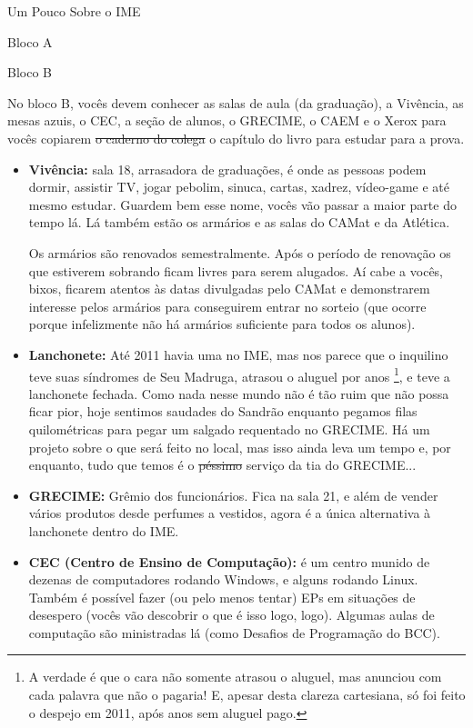 \begin{secao}{Um Pouco Sobre o IME}
\begin{subsecao}{Bloco A}
\begin{itemize}
\end{itemize}
\end{subsecao}

\begin{subsecao}{Bloco B}

No bloco B, vocês devem conhecer as salas de aula (da graduação), a Vivência, as
mesas azuis, o CEC, a seção de alunos, o GRECIME, o CAEM e o Xerox para vocês
copiarem \sout{o caderno do colega} o capítulo do livro para estudar para a prova.

\begin{itemize}
\item {\bf Vivência:} sala 18, arrasadora de graduações, é onde as pessoas podem 
dormir, assistir TV, jogar pebolim, sinuca, cartas, xadrez, vídeo-game e até 
mesmo estudar. Guardem bem esse nome, vocês vão passar a maior parte do tempo lá. 
Lá também estão os armários e as salas do CAMat e da Atlética.

Os armários são renovados semestralmente. Após o período de renovação os que 
estiverem sobrando ficam livres para serem alugados. Aí cabe a vocês, bixos, ficarem 
atentos às datas divulgadas pelo CAMat e demonstrarem interesse pelos armários para 
conseguirem entrar no sorteio (que ocorre porque infelizmente não há armários 
suficiente para todos os alunos).

\item {\bf Lanchonete:} Até 2011 havia uma no IME, mas nos parece que o inquilino
teve suas síndromes de Seu Madruga, atrasou o aluguel por anos \footnote{A verdade 
é que o cara não somente atrasou o aluguel, mas anunciou com cada palavra que não 
o pagaria! E, apesar desta clareza cartesiana, só foi feito o despejo em 2011, 
após anos sem aluguel pago.}, e teve a lanchonete fechada. Como nada nesse
mundo não é tão ruim que não possa ficar pior, hoje sentimos saudades do Sandrão
enquanto pegamos filas quilométricas para pegar um salgado requentado no GRECIME.
Há um projeto sobre o que será feito no local, mas isso ainda leva um tempo e, 
por enquanto, tudo que temos é o \sout{péssimo} serviço da tia do GRECIME... 

\item {\bf GRECIME:} Grêmio dos funcionários. Fica na sala 21, e além de vender
vários produtos desde perfumes a vestidos, agora é a única alternativa à
lanchonete dentro do IME.

\item {\bf CEC (Centro de Ensino de Computação):} é um centro munido de dezenas
de computadores rodando Windows, e alguns rodando Linux. Também é possível fazer 
(ou pelo menos tentar) EPs em situações de desespero (vocês vão descobrir o que é 
isso logo, logo). Algumas aulas de computação são ministradas lá (como Desafios 
de Programação do BCC).
 

\end{itemize}
\end{subsecao}
\end{secao}
